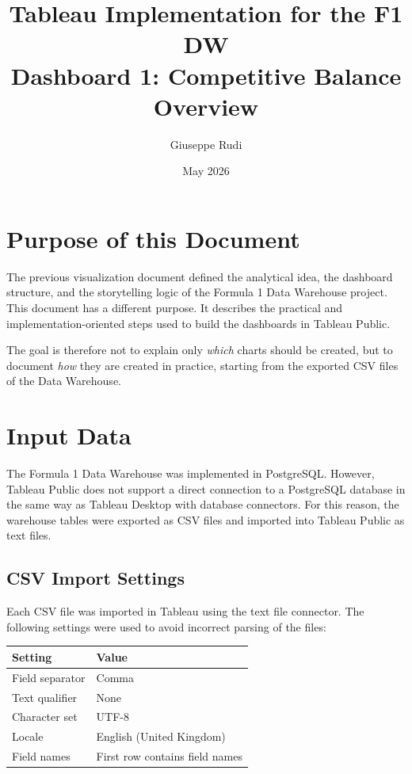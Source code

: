 \documentclass[12pt,a4paper]{article}
\title{\textbf{Tableau Implementation for the F1 DW}\\
	\large Dashboard 1: Competitive Balance Overview}
\author{Giuseppe Rudi}
\date{May 2026}
\begin{document}
	
	\maketitle
	
	\tableofcontents
	\newpage
	

	\section{Purpose of this Document}

	The previous visualization document defined the analytical idea, the dashboard structure, and the storytelling logic of the Formula 1 Data Warehouse project.
	This document has a different purpose.
	It describes the practical and implementation-oriented steps used to build the dashboards in Tableau Public.
	
	The goal is therefore not to explain only \textit{which} charts should be created, but to document \textit{how} they are created in practice, starting from the exported CSV files of the Data Warehouse.
	
	

	

	\section{Input Data}

	
	The Formula 1 Data Warehouse was implemented in PostgreSQL.
	However, Tableau Public does not support a direct connection to a PostgreSQL database in the same way as Tableau Desktop with database connectors.
	For this reason, the warehouse tables were exported as CSV files and imported into Tableau Public as text files.
	


	\subsection{CSV Import Settings}

	
	Each CSV file was imported in Tableau using the text file connector.
	The following settings were used to avoid incorrect parsing of the files:
	
	\begin{longtable}{p{5cm} p{8cm}}
		\toprule
		\textbf{Setting} & \textbf{Value} \\
		\midrule
		Field separator & Comma \\
		Text qualifier & None \\
		Character set & UTF-8 \\
		Locale & English (United Kingdom) \\
		Field names & First row contains field names \\
		\bottomrule
	\end{longtable}
	
\end{document}
